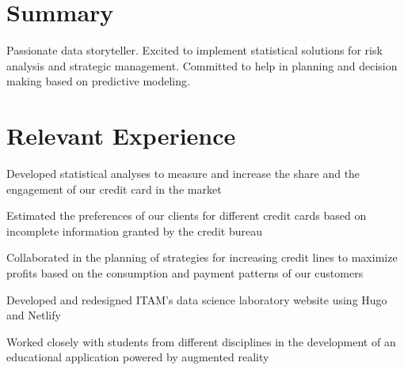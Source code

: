 \documentclass[]{resume}
\begin{document}



\begin{minipage}[t]{0.70\textwidth} 


\section{Summary}

Passionate data storyteller. Excited to implement statistical solutions for risk analysis and strategic management. Committed to help in planning and decision making based on predictive modeling.


\section{Relevant Experience}

\vspace{\topsep} %
\begin{tightemize}
\sectionsep
\item Developed statistical analyses to measure and increase the share and the engagement of our credit card in the market
\item Estimated the preferences of our clients for different credit cards based on incomplete information granted by the credit bureau
\item Collaborated in the planning of strategies for increasing credit lines to maximize profits based on the consumption and payment patterns of our customers
\end{tightemize}
\sectionsep

\begin{tightemize}
\sectionsep
\item Developed and redesigned ITAM's data science laboratory website using Hugo and Netlify
\item Worked closely with students from different disciplines in the development of an educational application powered by augmented reality
\end{tightemize}
\sectionsep


\end{minipage}
\end{document}
